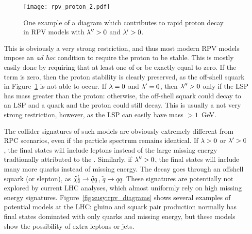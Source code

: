 \begin{figure}
\centering
\texttt{[image: rpv\_proton\_2.pdf]}
\caption{One example of a diagram which contributes to rapid proton decay in RPV models with $\lambda^{\prime\prime} > 0$ and $\lambda^{\prime} > 0$.}
\label{fig:susy:rpv_proton}
\end{figure}

This is obviously a very strong restriction, and thus most modern RPV models impose an \textit{ad hoc} condition to require the proton to be stable. This is mostly easily done by requiring that at least one of \lamp or \lampp be exactly equal to zero. If the \lampp term is zero, then the proton stability is clearly preserved, as the off-shell squark in Figure~\ref{fig:susy:rpv_proton} is not able to occur. If $\lambda = 0$ and $\lambda^{\prime} = 0$, then $\lambda^{\prime\prime} > 0$ only if the LSP has mass greater than the proton: otherwise, the off-shell squark could decay to an LSP and a quark and the proton could still decay. This is usually a not very strong restriction, however, as the LSP can easily have mass $> 1$~GeV.

The collider signatures of such models are obviously extremely different from RPC scenarios, even if the particle spectrum remains identical. If $\lambda > 0$ or $\lambda^{\prime} > 0$, the final states will include leptons instead of the large missing energy tradtionally attributed to the \lsp. Similarly, if $\lambda^{\prime\prime} > 0$, the final states will include many more quarks instead of missing energy. The decay goes through an offshell squark (or slepton), as $\tilde{\chi}_0^1 \rightarrow \tilde{q} q$, $\tilde{q}\rightarrow q q$. These signatures are potentially not explored by current LHC analyses, which almost uniformly rely on high missing energy signatures. Figure~\ref{fig:susy:rpv_diagrams} shows several examples of potential models at the LHC: gluino and squark pair production normally has final states dominated with only quarks and missing energy, but these models show the possibility of extra leptons or jets.



